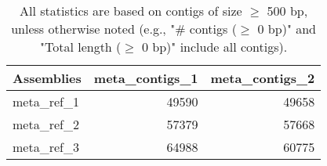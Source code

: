 \documentclass[12pt,a4paper]{article}
\begin{document}
\begin{table}[ht]
\begin{center}
\caption{All statistics are based on contigs of size $\geq$ 500 bp, unless otherwise noted (e.g., "\# contigs ($\geq$ 0 bp)" and "Total length ($\geq$ 0 bp)" include all contigs).}
\begin{tabular}{|l*{2}{|r}|}
\hline
Assemblies & meta\_contigs\_1 & meta\_contigs\_2 \\ \hline
meta\_ref\_1 & 49590 & 49658 \\ \hline
meta\_ref\_2 & 57379 & 57668 \\ \hline
meta\_ref\_3 & 64988 & 60775 \\ \hline
\end{tabular}
\end{center}
\end{table}
\end{document}
